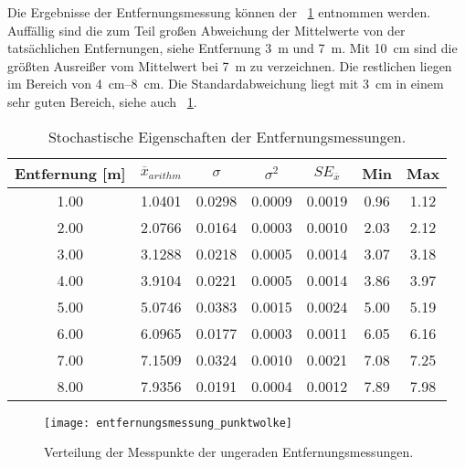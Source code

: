 Die Ergebnisse der Entfernungsmessung können der \tablename~\ref{tab:entfernungsmessung_stochastik} entnommen werden. Auffällig sind die zum Teil großen Abweichung der Mittelwerte von der tatsächlichen Entfernungen, siehe Entfernung \SI{3}{\meter} und \SI{7}{\meter}. Mit \SI{10}{\centi\meter} sind die größten Ausreißer vom Mittelwert bei \SI{7}{\meter} zu verzeichnen. Die restlichen liegen im Bereich von \SIrange{4}{8}{\centi\meter}. Die Standardabweichung liegt mit \SI{3}{\centi\meter} in einem sehr guten Bereich, siehe auch \figurename~\ref{fig:entfernungsmessung_punktwolke}.

\begin{table}[h!]
	\centering
	\begin{tabular}{||c||c|c|c|c|c|c||}
		\hline
		Entfernung [\si{\meter}] & $\overline{x}_{arithm}$ & $\sigma$ & $\sigma^2$ & $SE_{\overline{x}}$ & Min & Max\\\hline
		\hline
		\num{1.00} & \num{1.0401} & \num{0.0298} & \num{0.0009} & \num{0.0019} & \num{0.96} & \num{1.12}\\\hline
		\num{2.00} & \num{2.0766} & \num{0.0164} & \num{0.0003} & \num{0.0010} & \num{2.03} & \num{2.12}\\\hline
		\num{3.00} & \num{3.1288} & \num{0.0218} & \num{0.0005} & \num{0.0014} & \num{3.07} & \num{3.18}\\\hline
		\num{4.00} & \num{3.9104} & \num{0.0221} & \num{0.0005} & \num{0.0014} & \num{3.86} & \num{3.97}\\\hline
		\num{5.00} & \num{5.0746} & \num{0.0383} & \num{0.0015} & \num{0.0024} & \num{5.00} & \num{5.19}\\\hline
		\num{6.00} & \num{6.0965} & \num{0.0177} & \num{0.0003} & \num{0.0011} & \num{6.05} & \num{6.16}\\\hline
		\num{7.00} & \num{7.1509} & \num{0.0324} & \num{0.0010} & \num{0.0021} & \num{7.08} & \num{7.25}\\\hline
		\num{8.00} & \num{7.9356} & \num{0.0191} & \num{0.0004} & \num{0.0012} & \num{7.89} & \num{7.98}\\\hline
	\end{tabular}
	\caption{Stochastische Eigenschaften der Entfernungsmessungen.}
	\label{tab:entfernungsmessung_stochastik}
\end{table}

\begin{figure}[h!]
  \centering
  \texttt{[image: entfernungsmessung\_punktwolke]}
	\caption{Verteilung der Messpunkte der ungeraden Entfernungsmessungen.}
	\label{fig:entfernungsmessung_punktwolke}
\end{figure}


